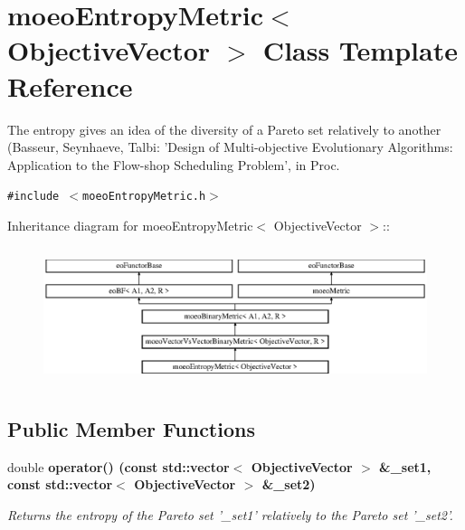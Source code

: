 \section{moeo\-Entropy\-Metric$<$ Objective\-Vector $>$ Class Template Reference}
\label{classmoeoEntropyMetric}
The entropy gives an idea of the diversity of a Pareto set relatively to another (Basseur, Seynhaeve, Talbi: 'Design of Multi-objective Evolutionary Algorithms: Application to the Flow-shop Scheduling Problem', in Proc.  


{\tt \#include $<$moeo\-Entropy\-Metric.h$>$}

Inheritance diagram for moeo\-Entropy\-Metric$<$ Objective\-Vector $>$::\begin{figure}[H]
\begin{center}
\leavevmode
\includegraphics[height=4.03458cm]{classmoeoEntropyMetric}
\end{center}
\end{figure}
\subsection*{Public Member Functions}
\begin{CompactItemize}
\item 
double \bf{operator()} (const std::vector$<$ \bf{Objective\-Vector} $>$ \&\_\-set1, const std::vector$<$ \bf{Objective\-Vector} $>$ \&\_\-set2)
\begin{CompactList}\small\item\em Returns the entropy of the Pareto set '\_\-set1' relatively to the Pareto set '\_\-set2'. \item\end{CompactList}\end{CompactItemize}
